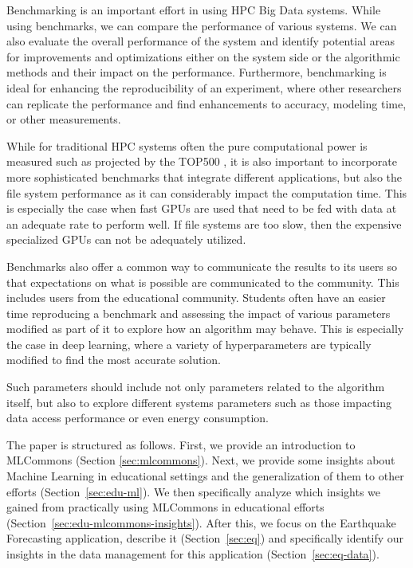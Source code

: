\documentclass[utf8]{FrontiersinVancouver} %
\begin{document}
Benchmarking is an important effort in using HPC Big Data systems.
While using benchmarks, we can compare the performance of various
systems. We can also evaluate the overall performance of the system
and identify potential areas for improvements and optimizations either
on the system side or the algorithmic methods and their impact on the
performance. Furthermore, benchmarking is ideal for enhancing the
reproducibility of an experiment, where other researchers can
replicate the performance and find enhancements to accuracy, modeling
time, or other measurements.

While for traditional HPC systems often the pure computational power
is measured such as projected by the TOP500 \cite{dongarra1997top500,www-top500}, it is
also important to incorporate more sophisticated benchmarks that
integrate different applications, but also the file system performance
as it can considerably impact the computation time. This is especially
the case when fast GPUs are used that need to be fed with data at an
adequate rate to perform well. If file systems are too slow, then the
expensive specialized GPUs can not be adequately utilized.

Benchmarks also offer a common way to communicate the results to its
users so that expectations on what is possible are communicated to the
community. This includes users from the educational
community. Students often have an easier time reproducing a benchmark
and assessing the impact of various parameters modified as part of it
to explore how an algorithm may behave. This is especially the case in
deep learning, where a variety of hyperparameters are typically
modified to find the most accurate solution.

Such parameters should include not only parameters related to
the algorithm itself, but also to explore different systems parameters
such as those impacting data access performance or even energy
consumption.

The paper is structured as follows. First, we provide an introduction
to MLCommons (Section \ref{sec:mlcommons}).  Next, we provide some
insights about Machine Learning in educational settings and the
generalization of them to other efforts (Section~\ref{sec:edu-ml}). We
then specifically analyze which insights we gained from practically
using MLCommons in educational efforts
(Section~\ref{sec:edu-mlcommons-insights}). After this, we focus on
the Earthquake Forecasting application, describe it
(Section~\ref{sec:eq}) and specifically identify our insights in the
data management for this application (Section~\ref{sec:eq-data}).
\end{document}
